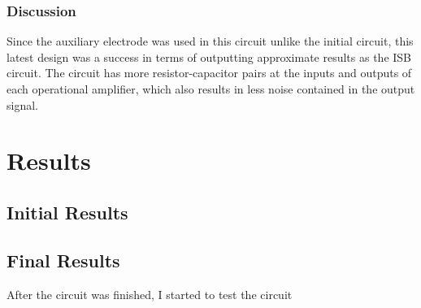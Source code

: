 \subsection{Discussion}
Since the auxiliary electrode was used in this circuit unlike the initial circuit, this latest design was a success in terms of outputting approximate results as the ISB circuit. The circuit has more resistor-capacitor pairs at the inputs and outputs of each operational amplifier, which also results in less noise contained in the output signal.

\chapter{Results}  
\section{Initial Results}



\section{Final Results}
After the circuit was finished, I started to test the circuit 




